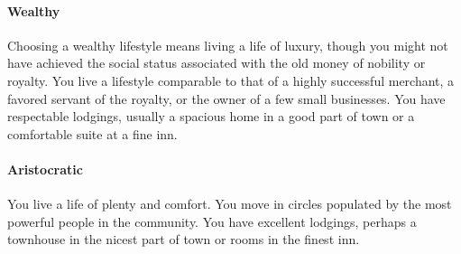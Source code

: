     \paragraph{Wealthy}
        Choosing a wealthy lifestyle means living a life of luxury, though you might not have achieved the social status associated with the old money of nobility or royalty.
        You live a lifestyle comparable to that of a highly successful merchant, a favored servant of the royalty, or the owner of a few small businesses.
        You have respectable lodgings, usually a spacious home in a good part of town or a comfortable suite at a fine inn.
    \paragraph{Aristocratic}
        You live a life of plenty and comfort.
        You move in circles populated by the most powerful people in the community.
        You have excellent lodgings, perhaps a townhouse in the nicest part of town or rooms in the finest inn.

